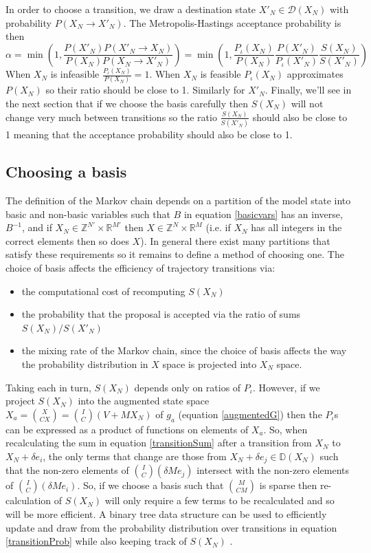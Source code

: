 \documentclass{article}
\begin{document}
In order to choose a transition, we draw a destination state $X'_N \in \mathcal{D}(X_N)$ with probability $P(X_N \to X'_N)$. The Metropolis-Hastings acceptance probability is then
\[
\alpha = 
\min\left( 1, \frac{P(X'_N)P(X'_N \to X_N)}{P(X_N)P(X_N \to X'_N)} \right) = \min\left(1, 
\frac{P_\iota(X_N)}{P(X_N)} \frac{P(X'_N)}{P_\iota(X'_N)}  \frac{S(X_N)}{S(X'_N)}\right)
\]
When $X_N$ is infeasible $\frac{P_\iota(X_N)}{P(X_N)} = 1$. When $X_N$ is feasible $P_\iota(X_N)$ approximates $P(X_N)$ so their ratio should be close to 1. Similarly for $X'_N$. Finally, we'll see in the next section that if we choose the basis carefully then $S(X_N)$ will not change very much between transitions so the ratio $ \frac{S(X_N)}{S(X'_N)}$ should also be close to 1 meaning that the acceptance probability should also be close to 1.

\subsection{Choosing a basis}
\label{basis}
The definition of the Markov chain depends on a partition of the model state into basic and non-basic variables such that $B$ in equation \eqref{basicvars} has an inverse, $B^{-1}$, and if $X_N \in \mathbb{Z}^{N'} \times \mathbb{R}^{M'}$ then $X \in \mathbb{Z}^{N} \times \mathbb{R}^{M}$ (i.e. if $X_N$ has all integers in the correct elements then so does $X$). In general there exist many partitions that satisfy these requirements so it remains to define a method of choosing one. The choice of basis affects the efficiency of trajectory transitions via:
\begin{itemize}
\item the computational cost of recomputing $S(X_N)$

\item the probability that the proposal is accepted via the ratio of sums $S(X_N)/S(X'_N)$

\item the mixing rate of the Markov chain, since the choice of basis affects the way the probability distribution in $X$ space is projected into $X_N$ space.
\end{itemize}

Taking each in turn, $S(X_N)$ depends only on ratios of $P_\iota$. However, if we project $S(X_N)$ into the augmented state space $X_a = {X \choose CX} = {I \choose C}(V + MX_N)$ of $g_a$ (equation \eqref{augmentedG}) then the $P_\iota$s can be expressed as a product of functions on elements of $X_a$. So, when recalculating the sum in equation \eqref{transitionSum} after a transition from $X_N$ to $X_N + \delta e_i$, the only terms that change are those from $X_N + \delta e_j \in \mathbb{D}(X_N)$ such that the non-zero elements of ${I \choose C}(\delta Me_j)$ intersect with the non-zero elements of ${I \choose C}(\delta Me_i)$. So, if we choose a basis such that ${M \choose CM}$ is sparse then re-calculation of $S(X_N)$ will only require a few terms to be recalculated and so will be more efficient. A binary tree data structure can be used to efficiently update and draw from the probability distribution over transitions in equation \eqref{transitionProb} while also keeping track of $S(X_N)$ \citep{TangMutableCategorical}.
\end{document}
